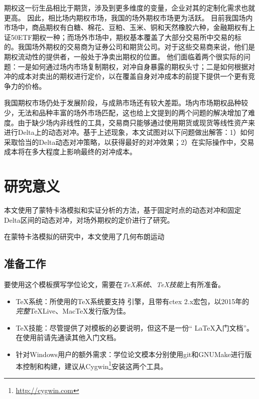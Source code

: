 期权这一衍生品相比于期货，涉及到更多维度的变量，企业对其的定制化需求也就更高。
因此，相比场内期权市场，我国的场外期权市场更为活跃。
目前我国场内市场中，商品期权有白糖、棉花、豆粕、玉米、铜和天然橡胶六种，金融期权有上证50ETF期权一种；而场外市场中，期权基本覆盖了大部分交易所中交易的标的。我国场外期权的交易商为证券公司和期货公司。对于这些交易商来说，他们是期权流动性的提供者，一般处于净卖出期权的位置。
他们面临着两个很实际的问题：一是如何通过场内市场复制期权，对冲自身暴露的期权头寸；二是如何根据对冲的成本对卖出的期权进行定价，以在覆盖自身对冲成本的前提下提供一个更有竞争力的价格。

我国期权市场仍处于发展阶段，与成熟市场还有较大差距。场内市场期权品种较少，无法和品种丰富的场外市场匹配，这也给上文提到的两个问题的解决增加了难度。由于缺少场内非线性的工具，交易商只能够通过使用期货或现货等线性资产来进行Delta上的动态对冲。基于上述现象，本文试图对以下问题做出解答：1）如何采取恰当的Delta动态对冲策略，以获得最好的对冲效果；2）在实际操作中，交易成本将在多大程度上影响最终的对冲成本。

\section{研究意义}

本文使用了蒙特卡洛模拟和实证分析的方法，基于固定时点的动态对冲和固定Delta区间的动态对冲，对场外期权的定价进行了研究。

在蒙特卡洛模拟的研究中，本文使用了几何布朗运动





\subsection{准备工作}
\label{sec:requirements}

要使用这个模板撰写学位论文，需要在\emph{TeX系统}、\emph{TeX技能}上有所准备。

\begin{itemize}[noitemsep,topsep=0pt,parsep=0pt,partopsep=0pt]
	\item {\TeX}系统：所使用的{\TeX}系统要支持 \XeTeX 引擎，且带有ctex 2.x宏包，以2015年的\emph{完整}TeXLive、MacTeX发行版为佳。
	\item TeX技能：尽管提供了对模板的必要说明，但这不是一份“ \LaTeX 入门文档”。在使用前请先通读其他入门文档。
	\item 针对Windows用户的额外需求：学位论文模本分别使用git和GNUMake进行版本控制和构建，建议从Cygwin\footnote{\url{http://cygwin.com}}安装这两个工具。
\end{itemize}

